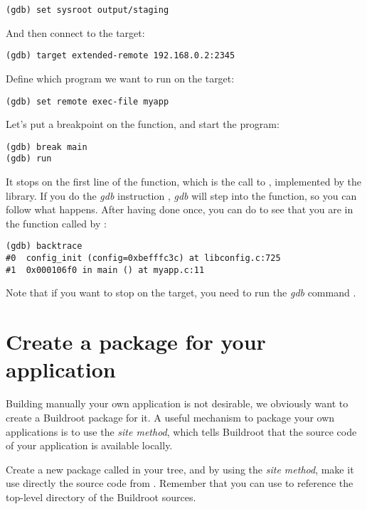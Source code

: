 \begin{verbatim}
(gdb) set sysroot output/staging
\end{verbatim}

And then connect to the target:

\begin{verbatim}
(gdb) target extended-remote 192.168.0.2:2345
\end{verbatim}

Define which program we want to run on the target:

\begin{verbatim}
(gdb) set remote exec-file myapp
\end{verbatim}

Let's put a breakpoint on the  function, and start the
program:

\begin{verbatim}
(gdb) break main
(gdb) run
\end{verbatim}

It stops on the first line of the  function, which is the
call to , implemented by the 
library. If you do the {\em gdb} instruction , {\em gdb}
will step into the function, so you can follow what happens. After
having done  once, you can do  to see that
you are in the function  called by :

\begin{verbatim}
(gdb) backtrace
#0  config_init (config=0xbefffc3c) at libconfig.c:725
#1  0x000106f0 in main () at myapp.c:11
\end{verbatim}

Note that if you want  to stop on the target, you need
to run the {\em gdb} command .

\section{Create a package for your application}

Building manually your own application is not desirable, we obviously
want to create a Buildroot package for it. A useful mechanism to
package your own applications is to use the
 {\em site method}, which tells Buildroot that the source
code of your application is available locally.

Create a new package called  in your 
tree, and by using the  {\em site method}, make it use
directly the  source code from
. Remember that you can use 
to reference the top-level directory of the Buildroot sources.

